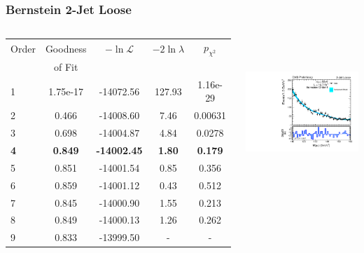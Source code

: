 \documentclass{beamer}
\begin{document}
\begin{frame}
\frametitle{Bernstein 2-Jet Loose}
  \begin{columns}[c]
   \column{60mm}
      \begin{center}
      \tiny
\begin{tabular}{|l|c|c|c|c|} \hline
Order & Goodness & $-\ln\mathcal{L}$ & $-2\ln\lambda$ & $p_{\chi^2}$ \\ 
 & of Fit  &  & &  \\ \hline \hline
1 & 1.75e-17 & -14072.56 & 127.93 & 1.16e-29  \\ \hline
2 & 0.466 & -14008.60 & 7.46 & 0.00631  \\ \hline
3 & 0.698 & -14004.87 & 4.84 & 0.0278  \\ \hline
\bf 4 & \bf 0.849 & \bf -14002.45 & \bf 1.80 & \bf 0.179  \\ \hline
5 & 0.851 & -14001.54 & 0.85 & 0.356  \\ \hline
6 & 0.859 & -14001.12 & 0.43 & 0.512  \\ \hline
7 & 0.845 & -14000.90 & 1.55 & 0.213  \\ \hline
8 & 0.849 & -14000.13 & 1.26 & 0.262  \\ \hline
9 & 0.833 & -13999.50 & - & -  \\ \hline
\end{tabular}
\\
\normalsize
\vspace{2em}
\bf
      \end{center}
   \column{60mm}
      \begin{center}
        \includegraphics[height=55mm]{wholeRangeHggStudy1/plotsOrderStudyPolysLowOrders/order_Shape_Jet2CutsFailVBFGF_Bernstein4.pdf}
      \end{center}
  \end{columns}
  \begin{center}
  \end{center}
\end{frame}
\end{document}
